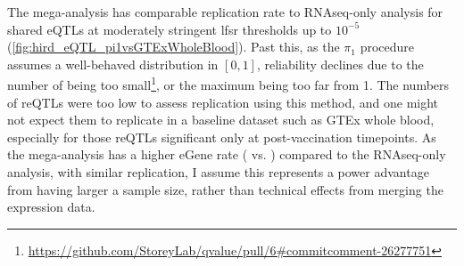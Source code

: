 The mega-analysis has comparable replication rate to \gls{RNAseq}-only analysis for shared \glspl{eQTL} at moderately stringent \gls{lfsr} thresholds up to $10^{-5}$ (\autoref{fig:hird_eQTL_pi1vsGTExWholeBlood}).
Past this, as the $\pi_1$ procedure assumes a well-behaved \pvalue distribution in $\left[0, 1\right]$, 
reliability declines due to the number of \pvalues being too small\footnote{\url{https://github.com/StoreyLab/qvalue/pull/6\#commitcomment-26277751}}, or the maximum \pvalue being too far from 1.
The numbers of \glspl{reQTL} were too low to assess replication using this method, and one might not expect them to replicate in a baseline dataset such as GTEx whole blood, especially for those \glspl{reQTL} significant only at post-vaccination timepoints.
As the mega-analysis has a higher eGene rate ( vs. ) compared to the \gls{RNAseq}-only analysis, with similar replication,
I assume this represents a power advantage from having larger a sample size, rather than technical effects from merging the expression data.

